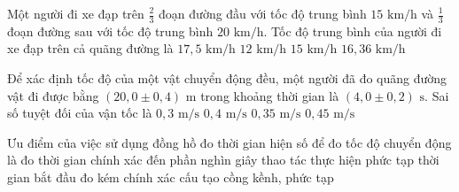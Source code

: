 \begin{ex} Một người đi xe đạp trên $\frac{2}{3}$ đoạn đường đầu với tốc độ trung bình $15\text{ km/h}$ và $\frac{1}{3}$ đoạn đường sau với tốc độ trung bình $20\text{ km/h}$. Tốc độ trung bình của người đi xe đạp trên cả quãng đường là
\choice
{$17{,}5\text{ km/h}$}
{$12\text{ km/h}$}
{$15\text{ km/h}$}
{\True $16{,}36\text{ km/h}$}
\end{ex}

\begin{ex} Để xác định tốc độ của một vật chuyển động đều, một người đã đo quãng đường vật đi được bằng $(20{,}0 \pm 0{,}4)\text{ m}$ trong khoảng thời gian là $(4{,}0 \pm 0{,}2)\text{ s}$. Sai số tuyệt đối của vận tốc là
\choice
{$0{,}3\text{ m/s}$}
{$0{,}4\text{ m/s}$}
{\True $0{,}35\text{ m/s}$}
{$0{,}45\text{ m/s}$}
\end{ex}

\begin{ex} Ưu điểm của việc sử dụng đồng hồ đo thời gian hiện số để đo tốc độ chuyển động là
\choice
{\True đo thời gian chính xác đến phần nghìn giây}
{thao tác thực hiện phức tạp}
{thời gian bắt đầu đo kém chính xác}
{cấu tạo cồng kềnh, phức tạp}
\end{ex}

